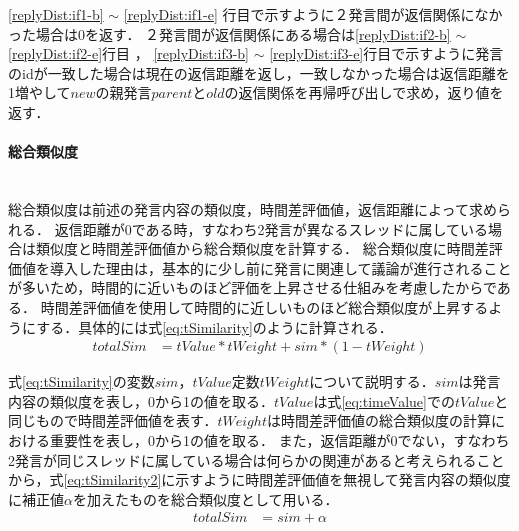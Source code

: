 \ref{replyDist:if1-b} $\sim$ \ref{replyDist:if1-e} 行目で示すように２発言間が返信関係になかった場合は0を返す．
２発言間が返信関係にある場合は\ref{replyDist:if2-b} $\sim$ \ref{replyDist:if2-e}行目 ， \ref{replyDist:if3-b} $\sim$ \ref{replyDist:if3-e}行目で示すように発言のidが一致した場合は現在の返信距離を返し，一致しなかった場合は返信距離を1増やして$new$の親発言$parent$と$old$の返信関係を再帰呼び出しで求め，返り値を返す．

\paragraph{総合類似度}\ \\
総合類似度は前述の発言内容の類似度，時間差評価値，返信距離によって求められる．
返信距離が0である時，すなわち2発言が異なるスレッドに属している場合は類似度と時間差評価値から総合類似度を計算する．
総合類似度に時間差評価値を導入した理由は，基本的に少し前に発言に関連して議論が進行されることが多いため，時間的に近いものほど評価を上昇させる仕組みを考慮したからである．
時間差評価値を使用して時間的に近しいものほど総合類似度が上昇するようにする．具体的には式\ref{eq:tSimilarity}のように計算される．
\begin{equation}
\begin{aligned}
\label{eq:tSimilarity}
totalSim & = tValue*tWeight + sim*(1-tWeight)
\end{aligned}
\end{equation}

式\ref{eq:tSimilarity}の変数$sim$，$tValue$定数$tWeight$について説明する．$sim$は発言内容の類似度を表し，0から1の値を取る．$tValue$は式\ref{eq:timeValue}での$tValue$と同じもので時間差評価値を表す．$tWeight$は時間差評価値の総合類似度の計算における重要性を表し，0から1の値を取る．
また，返信距離が0でない，すなわち2発言が同じスレッドに属している場合は何らかの関連があると考えられることから，式\ref{eq:tSimilarity2}に示すように時間差評価値を無視して発言内容の類似度に補正値$\alpha$を加えたものを総合類似度として用いる．
\begin{equation}
\begin{aligned}
\label{eq:tSimilarity2}
totalSim & =  sim + \alpha
\end{aligned}
\end{equation}

